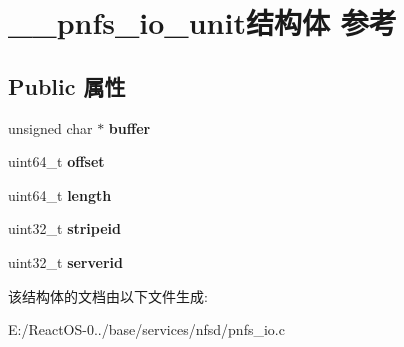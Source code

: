 \hypertarget{struct____pnfs__io__unit}{}\section{\+\_\+\+\_\+pnfs\+\_\+io\+\_\+unit结构体 参考}
\label{struct____pnfs__io__unit}
\subsection*{Public 属性}
\begin{DoxyCompactItemize}
\item 
\mbox{\label{struct____pnfs__io__unit_ac162b0903be8a55236c0f5c64e348a09}} 
unsigned char $\ast$ {\bfseries buffer}
\item 
\mbox{\label{struct____pnfs__io__unit_a15c63d0403c65cd78e92569ae6a5161d}} 
uint64\+\_\+t {\bfseries offset}
\item 
\mbox{\label{struct____pnfs__io__unit_a24fc2d5ba66d834d3736de3d3191700c}} 
uint64\+\_\+t {\bfseries length}
\item 
\mbox{\label{struct____pnfs__io__unit_a655ae09e7a6a4a3d2ce9fce427df4eb9}} 
uint32\+\_\+t {\bfseries stripeid}
\item 
\mbox{\label{struct____pnfs__io__unit_a2a3ecfb2db5139ba9a5215ea626b7374}} 
uint32\+\_\+t {\bfseries serverid}
\end{DoxyCompactItemize}


该结构体的文档由以下文件生成\+:\begin{DoxyCompactItemize}
\item 
E\+:/\+React\+O\+S-\/0../base/services/nfsd/pnfs\+\_\+io.\+c\end{DoxyCompactItemize}
